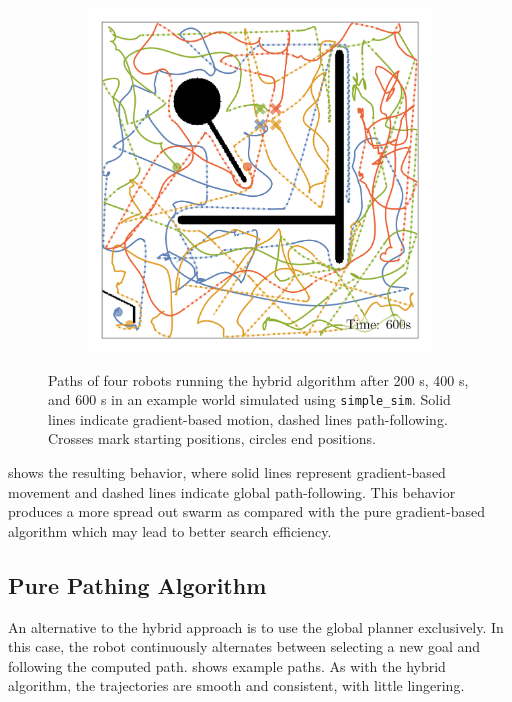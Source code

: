 \begin{figure}[H]
\begin{subfigure}[b]{\w}
    \end{subfigure}
    \begin{subfigure}[b]{\w}
        \centering
        \includegraphics[width=\textwidth]{./figures/plots/paths/search:hybrid-paths-(after-600s).png}
    \end{subfigure}
    \caption{Paths of four robots running the hybrid algorithm after 200 s, 400 s, and 600 s in an example world simulated using \texttt{simple\_sim}. Solid lines indicate gradient-based motion, dashed lines path-following. Crosses mark starting positions, circles end positions.}
    \label{fig:hybrid-paths}
\end{figure}

 shows the resulting behavior, where solid lines represent gradient-based movement and dashed lines indicate global path-following. This behavior produces a more spread out swarm as compared with the pure gradient-based algorithm which may lead to better search efficiency.

\subsection{Pure Pathing Algorithm}
An alternative to the hybrid approach is to use the global planner exclusively. In this case, the robot continuously alternates between selecting a new goal and following the computed path.  shows example paths. As with the hybrid algorithm, the trajectories are smooth and consistent, with little lingering.

